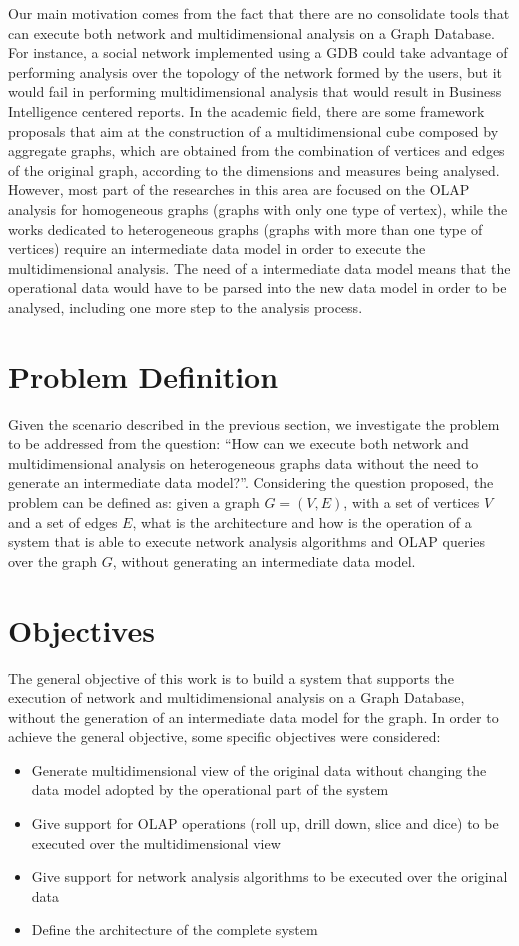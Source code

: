 Our main motivation comes from the fact that there are no consolidate tools that can execute both network and multidimensional analysis on a Graph Database. For instance, a social network implemented using a GDB could take advantage of performing analysis over the topology of the network formed by the users, but it would fail in performing multidimensional analysis that would result in Business Intelligence centered reports. In the academic field, there are some framework proposals that aim at the construction of a multidimensional cube composed by aggregate graphs, which are obtained from the combination of vertices and edges of the original graph, according to the dimensions and measures being analysed. However, most part of the researches in this area are focused on the OLAP analysis for homogeneous graphs (graphs with only one type of vertex), while the works dedicated to heterogeneous graphs (graphs with more than one type of vertices) require an intermediate data model in order to execute the multidimensional analysis. The need of a intermediate data model means that the operational data would have to be parsed into the new data model in order to be analysed, including one more step to the analysis process.

\section{Problem Definition}
Given the scenario described in the previous section, we investigate the problem to be addressed from the question: ``How can we execute both network and multidimensional analysis on heterogeneous graphs data without the need to generate an intermediate data model?''. Considering the question proposed, the problem can be defined as: given a graph $G=(V,E)$, with a set of vertices $V$ and a set of edges $E$, what is the architecture and how is the operation of a system that is able to execute network analysis algorithms and OLAP queries over the graph $G$, without generating an intermediate data model.

\section{Objectives}
The general objective of this work is to build a system that supports the execution of network and multidimensional analysis on a Graph Database, without the generation of an intermediate data model for the graph. In order to achieve the general objective, some specific objectives were considered:
\begin{itemize}
\item Generate multidimensional view of the original data without changing the data model adopted by the operational part of the system
\item Give support for OLAP operations (roll up, drill down, slice and dice) to be executed over the multidimensional view
\item Give support for network analysis algorithms to be executed over the original data
\item Define the architecture of the complete system
\end{itemize}

